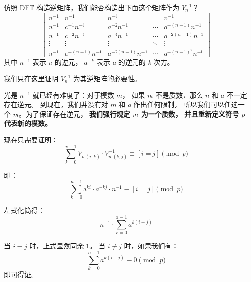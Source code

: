 \documentclass[12pt, UTF8]{article}
\begin{document}
    \bigskip
    仿照 DFT 构造逆矩阵，我们能否构造出下面这个矩阵作为 $V_n^{-1}$？
    \begin{equation*}
        \begin{bmatrix}
            n^{-1} & n^{-1} & n^{-1} & \cdots & n^{-1}
            \\
            n^{-1} & a^{-1}n^{-1} & a^{-2}n^{-1} & \cdots & a^{-(n - 1)}n^{-1}
            \\
            n^{-1} & a^{-2}n^{-1} & a^{-4}n^{-1} & \cdots & a^{-2(n - 1)}n^{-1}
            \\
            \vdots & \vdots & \vdots & \ddots & \vdots
            \\
            n^{-1} & a^{-(n - 1)}n^{-1} & a^{-2(n - 1)}n^{-1} &
            \cdots & a^{-(n - 1)^2}n^{-1}
        \end{bmatrix}
    \end{equation*}
    其中 $n^{-1}$ 表示 $n$ 的逆元，
    $a^{-k}$ 表示 $a$ 的逆元的 $k$ 次方。

    我们只在这里证明 $V_n^{-1}$ 为其逆矩阵的必要性。

    \bigskip
    光是 $n^{-1}$ 就已经有难度了：对于模数 $m$，
    如果 $m$ 不是质数，那么 $n$ 和 $a$ 不一定存在逆元。
    到现在，我们并没有对 $m$ 和 $a$ 作出任何限制，
    所以我们可以任选一个 $m$。为了保证存在逆元，
    \textbf{我们强行规定 $m$ 为一个质数，
    并且重新定义符号 $p$ 代表新的模数。}
    
    \bigskip
    现在只需要证明：
    \begin{equation*}
        \sum_{k = 0}^{n - 1} V_{n ~ (i, k)} · V^{-1}_{n ~ (k, j)}
        \equiv
        [i = j]
        \pmod {p}
    \end{equation*}

    即：
    \begin{equation*}
        \sum_{k = 0}^{n - 1} a^{ki} · a^{-kj} · n^{-1}
        \equiv
        [i = j]
        \pmod {p}
    \end{equation*}

    左式化简得：
    \begin{equation*}
        n^{-1} · \sum_{k = 0}^{n - 1} a^{k(i - j)}
    \end{equation*}

    当 $i = j$ 时，上式显然同余 $1$。
    当 $i \ne j$ 时，如果我们有：
    \begin{equation*}
        \sum_{k = 0}^{n - 1} a^{k(i - j)} \equiv 0 \pmod {p}
    \end{equation*}
    即可得证。
    
\end{document}
